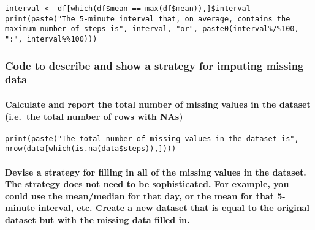 \documentclass[
]{article}
\begin{document}
\begin{verbatim}
interval <- df[which(df$mean == max(df$mean)),]$interval
print(paste("The 5-minute interval that, on average, contains the maximum number of steps is", interval, "or", paste0(interval%/%100, ":", interval%%100)))
\end{verbatim}

\hypertarget{code-to-describe-and-show-a-strategy-for-imputing-missing-data}{%
\subsubsection{Code to describe and show a strategy for imputing missing
data}\label{code-to-describe-and-show-a-strategy-for-imputing-missing-data}}

\hypertarget{calculate-and-report-the-total-number-of-missing-values-in-the-dataset-i.e.-the-total-number-of-rows-with-nas}{%
\paragraph{\texorpdfstring{Calculate and report the total number of
missing values in the dataset (i.e.~the total number of rows with
\color{red}{\verb|NA|}NAs)}{Calculate and report the total number of missing values in the dataset (i.e.~the total number of rows with NAs)}}\label{calculate-and-report-the-total-number-of-missing-values-in-the-dataset-i.e.-the-total-number-of-rows-with-nas}}

\begin{verbatim}
print(paste("The total number of missing values in the dataset is", nrow(data[which(is.na(data$steps)),])))
\end{verbatim}

\hypertarget{devise-a-strategy-for-filling-in-all-of-the-missing-values-in-the-dataset.-the-strategy-does-not-need-to-be-sophisticated.-for-example-you-could-use-the-meanmedian-for-that-day-or-the-mean-for-that-5-minute-interval-etc.-create-a-new-dataset-that-is-equal-to-the-original-dataset-but-with-the-missing-data-filled-in.}{%
\paragraph{Devise a strategy for filling in all of the missing values in
the dataset. The strategy does not need to be sophisticated. For
example, you could use the mean/median for that day, or the mean for
that 5-minute interval, etc. Create a new dataset that is equal to the
original dataset but with the missing data filled
in.}\label{devise-a-strategy-for-filling-in-all-of-the-missing-values-in-the-dataset.-the-strategy-does-not-need-to-be-sophisticated.-for-example-you-could-use-the-meanmedian-for-that-day-or-the-mean-for-that-5-minute-interval-etc.-create-a-new-dataset-that-is-equal-to-the-original-dataset-but-with-the-missing-data-filled-in.}}
\end{document}
